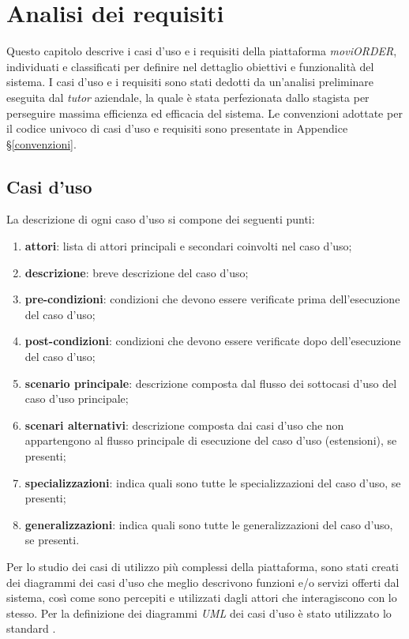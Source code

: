 
\chapter{Analisi dei requisiti}
\label{cap:analisi-requisiti}

Questo capitolo descrive i casi d'uso e i requisiti della piattaforma \textit{moviORDER}, individuati e classificati per definire nel dettaglio obiettivi e funzionalità del sistema. I casi d'uso e i requisiti sono stati dedotti da un'analisi preliminare eseguita dal \textit{tutor} aziendale, la quale è stata perfezionata dallo stagista per perseguire massima efficienza ed efficacia del sistema. Le convenzioni adottate per il codice univoco di casi d'uso e requisiti sono presentate in Appendice §\ref{convenzioni}.

\section{Casi d'uso}

La descrizione di ogni caso d'uso si compone dei seguenti punti:
\begin{enumerate}
	\item \textbf{attori}: lista di attori principali e secondari coinvolti nel caso d'uso;
    \item \textbf{descrizione}: breve descrizione del caso d'uso;
    \item \textbf{pre-condizioni}: condizioni che devono essere verificate prima dell'esecuzione del caso d'uso;
    \item \textbf{post-condizioni}: condizioni che devono essere verificate dopo dell'esecuzione del caso d'uso;
    \item \textbf{scenario principale}: descrizione composta dal flusso dei sottocasi d'uso del caso d'uso principale;
    \item \textbf{scenari alternativi}: descrizione composta dai casi d'uso che non appartengono al flusso
    principale di esecuzione del caso d'uso (estensioni), se presenti;
    \item \textbf{specializzazioni}: indica quali sono tutte le specializzazioni del caso d'uso, se presenti;
    \item \textbf{generalizzazioni}: indica quali sono tutte le generalizzazioni del caso d'uso, se presenti.
\end{enumerate}
Per lo studio dei casi di utilizzo più complessi della piattaforma, sono stati creati dei diagrammi dei casi d'uso che meglio descrivono funzioni e/o servizi offerti dal sistema, così come sono percepiti e utilizzati dagli attori che interagiscono con lo stesso. Per la definizione dei diagrammi \textit{UML} dei casi d'uso è stato utilizzato lo standard . 

